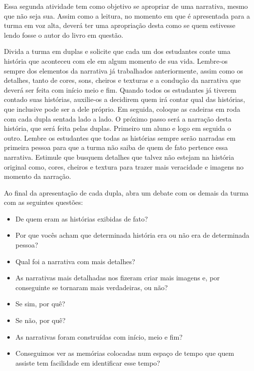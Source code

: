 \documentclass[11pt]{extarticle}
\begin{document}
Essa segunda atividade tem como objetivo se apropriar de uma narrativa, mesmo que não seja sua. Assim como a leitura, no momento em que é apresentada para a turma em voz alta, deverá ter uma apropriação desta como se quem estivesse lendo fosse o autor do livro em questão.

Divida a turma em duplas e solicite que cada um dos estudantes conte uma história que aconteceu com ele em algum momento de sua vida. Lembre-os sempre dos elementos da narrativa já trabalhados anteriormente, assim como os detalhes, tanto de cores, sons, cheiros e texturas e a condução da narrativa que deverá ser feita com início meio e fim. Quando todos os estudantes já tiverem contado suas histórias, auxilie-os a decidirem quem irá contar qual das histórias, que inclusive pode ser a dele próprio.  Em seguida, coloque as cadeiras em roda com cada dupla sentada lado a lado. O próximo passo será a narração desta história, que será feita pelas duplas. Primeiro um aluno e logo em seguida o outro. Lembre os estudantes que todas as histórias sempre serão narradas em primeira pessoa para que a turma não saiba de quem de fato pertence essa narrativa. Estimule que busquem detalhes que talvez não estejam na história original como, cores, cheiros e textura para trazer mais veracidade e imagens no momento da narração. 


Ao final da apresentação de cada dupla, abra um debate com os demais da turma com as seguintes questões:

\begin{itemize}
\item De quem eram as histórias exibidas de fato?
\item Por que vocês acham que determinada história era ou não era de determinada pessoa?
\item Qual foi a narrativa com mais detalhes?
\item As narrativas mais detalhadas nos fizeram criar mais imagens e, por conseguinte se tornaram mais verdadeiras, ou não?
\item Se sim, por quê? 
\item Se não, por quê?
\item As narrativas foram construídas com início, meio e fim?
\item Conseguimos ver as memórias colocadas num espaço de tempo que quem assiste tem facilidade em identificar esse tempo?
\end{itemize}
\end{document}
